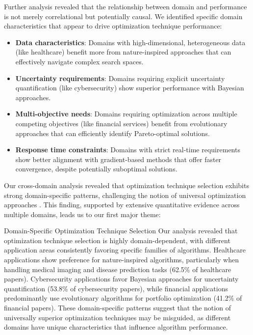 Further analysis revealed that the relationship between domain and performance is not merely correlational but potentially causal. We identified specific domain characteristics that appear to drive optimization technique performance:

\begin{itemize}
    \item \textbf{Data characteristics}: Domains with high-dimensional, heterogeneous data (like healthcare) benefit more from nature-inspired approaches that can effectively navigate complex search spaces.

    \item \textbf{Uncertainty requirements}: Domains requiring explicit uncertainty quantification (like cybersecurity) show superior performance with Bayesian approaches.

    \item \textbf{Multi-objective needs}: Domains requiring optimization across multiple competing objectives (like financial services) benefit from evolutionary approaches that can efficiently identify Pareto-optimal solutions.

    \item \textbf{Response time constraints}: Domains with strict real-time requirements show better alignment with gradient-based methods that offer faster convergence, despite potentially suboptimal solutions.
\end{itemize}

Our cross-domain analysis revealed that optimization technique selection exhibits strong domain-specific patterns, challenging the notion of universal optimization approaches \citep{Eid20223845, Sagu202535, Kanchanamala20232414}. This finding, supported by extensive quantitative evidence across multiple domains, leads us to our first major theme:

\begin{themebox}{Domain-Specific Optimization Technique Selection}
Our analysis revealed that optimization technique selection is highly domain-dependent, with different application areas consistently favoring specific families of algorithms. Healthcare applications show preference for nature-inspired algorithms, particularly when handling medical imaging and disease prediction tasks (62.5\% of healthcare papers). Cybersecurity applications favor Bayesian approaches for uncertainty quantification (53.8\% of cybersecurity papers), while financial applications predominantly use evolutionary algorithms for portfolio optimization (41.2\% of financial papers). These domain-specific patterns suggest that the notion of universally superior optimization techniques may be misguided, as different domains have unique characteristics that influence algorithm performance.
\end{themebox}

